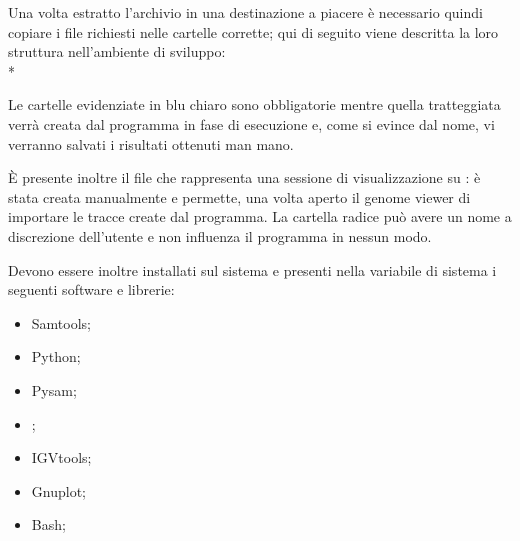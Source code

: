 Una volta estratto l'archivio in una destinazione a piacere è necessario quindi copiare i file richiesti nelle cartelle corrette; qui di seguito viene descritta la loro struttura nell'ambiente di sviluppo:\\*



Le cartelle evidenziate in blu chiaro sono obbligatorie mentre quella tratteggiata verrà creata dal programma in fase di esecuzione e, come si evince dal nome, vi verranno salvati i risultati ottenuti man mano.

È presente inoltre il file  che rappresenta una sessione di visualizzazione su : è stata creata manualmente e permette, una volta aperto il genome viewer di importare le tracce create dal programma.
La cartella radice può avere un nome a discrezione dell'utente e non influenza il programma in nessun modo.

Devono essere inoltre installati sul sistema e presenti nella variabile di sistema  i seguenti software e librerie:
\begin{itemize}
\item Samtools;
\item Python;
\item Pysam;
\item {};
\item IGVtools;
\item Gnuplot;
\item Bash;
\end{itemize}


